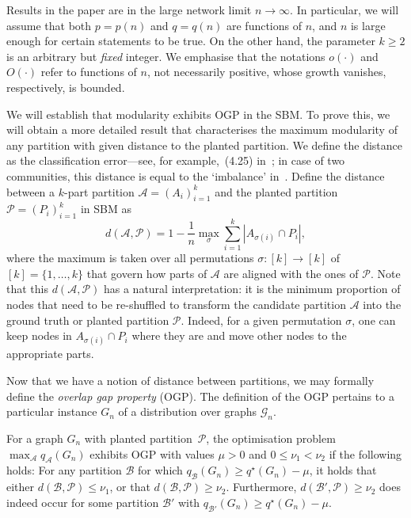 \documentclass[a4paper,UKenglish,cleveref, autoref, thm-restate,numberwithinsect]{lipics-v2021}
\newcommand{\cA}{\mathcal{A}}
\newcommand{\cB}{\mathcal{B}}
\newcommand{\cP}{\mathcal{P}}
\newcommand{\q}{q^{\star}}
\begin{document}
Results in the paper are in the large network limit $n \rightarrow \infty$. In particular, we will assume that both $p=p(n)$ and $q=q(n)$ are functions of $n$, and $n$ is large enough for certain statements to be true. On the other hand, the parameter $k \ge 2$ is an arbitrary but {\em fixed} integer. We emphasise that the notations $o(\cdot)$ and $O(\cdot)$ refer to functions of $n$, not necessarily positive, whose growth vanishes, respectively, is bounded. 
% 

We will establish that modularity exhibits OGP in the SBM. To prove this, we will obtain a more detailed result that characterises the maximum modularity of any partition with given distance to the planted partition. We define the distance as the classification error---see, for example,~(4.25) in~\cite{avrachenkov2022statistical}; in case of two communities, this distance is equal to the `imbalance' in~\cite{cohen2020power}. Define the distance between a $k$-part partition $\cA = (A_i)_{i=1}^k$ and the planted partition $\cP = (P_i)_{i=1}^k$ in SBM as
%
\begin{equation}\label{eq:dist_meas}
d(\cA, \cP) = 1 - \frac{1}{n} \max_\sigma \sum_{i=1}^k |A_{\sigma(i)} \cap P_i|, 
\end{equation}
where the maximum is taken over all permutations $\sigma: [k]\to[k]$ of $[k] = \{1, \ldots, k\}$ that govern how parts of $\cA$ are aligned with the ones of $\cP$. 
Note that this $d(\cA, \cP)$ has a natural interpretation: it is the minimum proportion of nodes that need to be re-shuffled to transform the candidate partition $\cA$ into the ground truth or planted partition $\cP$. Indeed, for a given permutation $\sigma$, one can keep nodes in $A_{\sigma(i)} \cap P_i$ where they are and move other nodes to the appropriate parts.

Now that we have a notion of distance between partitions, we may formally define the {\em overlap gap property} (OGP).
%
The definition of the OGP pertains to a particular instance $G_n$ of a distribution over graphs $\mathcal{G}_n$. %

\begin{definition}\label{def:OGP}
For a graph $G_n$ with planted partition~$\cP$, the optimisation problem $\max_\cA q_\cA(G_n) $
exhibits OGP with values $\mu > 0$ and $0 \leq \nu_1 < \nu_2$ if the following holds: %
For any partition $\cB$ for which $q_\cB(G_n)\geq \q(G_n)-\mu$, it holds that either $d(\cB, \cP)\leq \nu_1$, or that $d(\cB, \cP)\geq\nu_2$. Furthermore, $d(\cB', \cP)\geq \nu_2$ does indeed occur for some partition $\cB'$ with $q_{\cB'}(G_n)\geq \q(G_n) - \mu$. 
\end{definition}
\end{document}
